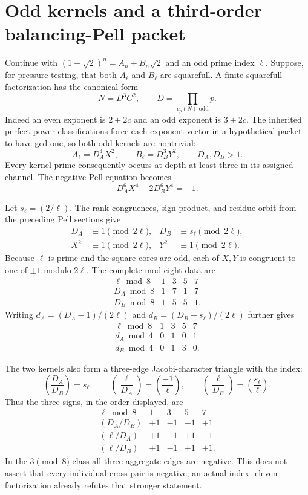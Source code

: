 \section{Odd kernels and a third-order balancing-Pell packet}
\label{sec:pell-odd-kernel-third-order}

Continue with
$(1+\sqrt2)^n=A_n+B_n\sqrt2$ and an odd prime index $\ell$.  Suppose, for
pressure testing, that both $A_\ell$ and $B_\ell$ are squarefull.  A finite
squarefull factorization has the canonical form
\[
 N=D^3C^2,\qquad
 D=\prod_{v_p(N)\text{ odd}}p.
\]
Indeed an even exponent is $2+2c$ and an odd exponent is $3+2c$.  The
inherited perfect-power classifications force each exponent vector in a
hypothetical packet to have gcd one, so both odd kernels are nontrivial:
\begin{equation}\label{eq:pell-odd-kernel-normal-form}
 A_\ell=D_A^3X^2,\qquad B_\ell=D_B^3Y^2,\qquad
 D_A,D_B>1.
\end{equation}
Every kernel prime consequently occurs at depth at least three in its
assigned channel.  The negative Pell equation becomes
\[
                   D_A^6X^4-2D_B^6Y^4=-1.
\]

Let $s_\ell=(2/\ell)$.  The rank congruences, sign product, and residue orbit
from the preceding Pell sections give
\begin{align}
 D_A&\equiv1\pmod{2\ell},&
 D_B&\equiv s_\ell\pmod{2\ell},
 \label{eq:pell-kernel-rank}\\
 X^2&\equiv1\pmod{2\ell},&Y^2&\equiv1\pmod{2\ell}.
 \label{eq:pell-core-square}
\end{align}
Because $\ell$ is prime and the square cores are odd, each of $X,Y$ is
congruent to one of $\pm1$ modulo $2\ell$.  The complete mod-eight data are
\[
\begin{array}{c|rrrr}
\ell\bmod8&1&3&5&7\\ \hline
D_A\bmod8&1&7&1&7\\
D_B\bmod8&1&5&5&1.
\end{array}
\]
Writing $d_A=(D_A-1)/(2\ell)$ and
$d_B=(D_B-s_\ell)/(2\ell)$ further gives
\[
\begin{array}{c|rrrr}
\ell\bmod8&1&3&5&7\\ \hline
d_A\bmod4&0&1&0&1\\
d_B\bmod4&0&1&3&0.
\end{array}
\]

The two kernels also form a three-edge Jacobi-character triangle with the
index:
\[
 \left(\frac{D_A}{D_B}\right)=s_\ell,\qquad
 \left(\frac{\ell}{D_A}\right)=\left(\frac{-1}{\ell}\right),
 \qquad
 \left(\frac{\ell}{D_B}\right)=
       \left(\frac{s_\ell}{\ell}\right).
\]
Thus the three signs, in the order displayed, are
\[
\begin{array}{c|rrrr}
\ell\bmod8&1&3&5&7\\ \hline
(D_A/D_B)&+1&-1&-1&+1\\
(\ell/D_A)&+1&-1&+1&-1\\
(\ell/D_B)&+1&-1&+1&+1.
\end{array}
\]
In the $3\pmod8$ class all three aggregate edges are negative.  This does
not assert that every individual cross pair is negative; an actual index-
eleven factorization already refutes that stronger statement.

